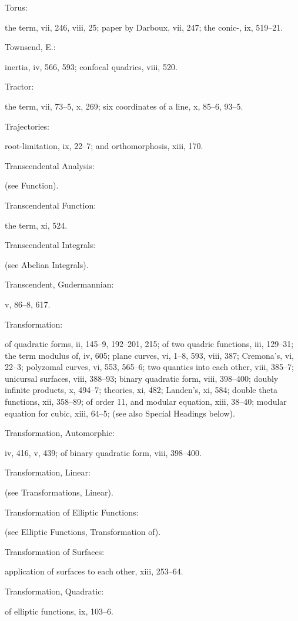 \documentclass[11pt,a4paper]{book}
\providecommand{\V}[1]{#1}
\providecommand{\IndexEntry}[2]{#1\dotfill #2\par}
\begin{document}
\IndexEntry{Torus}: the term, \V{vii}, 246, \V{viii}, 25; paper by Darboux, \V{vii}, 247; the conic-, \V{ix}, 519--21.

\IndexEntry{Townsend, E.}: inertia, \V{iv}, 566, 593; confocal quadrics, \V{viii}, 520.

\newpage

\setcounter{page}{128}

\IndexEntry{Tractor}: the term, \V{vii}, 73--5, \V{x}, 269; six coordinates of a line, \V{x}, 85--6, 93--5.

\IndexEntry{Trajectories}: root-limitation, \V{ix}, 22--7; and orthomorphosis, \V{xiii}, 170.

\IndexEntry{Transcendental Analysis}: (see Function).

\IndexEntry{Transcendental Function}: the term, \V{xi}, 524.

\IndexEntry{Transcendental Integrals}: (see Abelian Integrals).

\IndexEntry{Transcendent, Gudermannian}: \V{v}, 86--8, 617.

\IndexEntry{Transformation}: of quadratic forms, \V{ii}, 145--9, 192--201, 215; of two quadric functions, \V{iii}, 129--31; the term modulus of, \V{iv}, 605; plane curves, \V{vi}, 1--8, 593, \V{viii}, 387; Cremona's, \V{vi}, 22--3; polyzomal curves, \V{vi}, 553, 565--6; two quantics into each other, \V{viii}, 385--7; unicursal surfaces, \V{viii}, 388--93; binary quadratic form, \V{viii}, 398--400; doubly infinite products, \V{x}, 494--7; theories, \V{xi}, 482; Landen's, \V{xi}, 584; double theta functions, \V{xii}, 358--89; of order 11, and modular equation, \V{xiii}, 38--40; modular equation for cubic, \V{xiii}, 64--5; (see also Special Headings below).

\IndexEntry{Transformation, Automorphic}: \V{iv}, 416, \V{v}, 439; of binary quadratic form, \V{viii}, 398--400.

\IndexEntry{Transformation, Linear}: (see Transformations, Linear).

\IndexEntry{Transformation of Elliptic Functions}: (see Elliptic Functions, Transformation of).

\IndexEntry{Transformation of Surfaces}: application of surfaces to each other, \V{xiii}, 253--64.

\IndexEntry{Transformation, Quadratic}: of elliptic functions, \V{ix}, 103--6.
\end{document}
